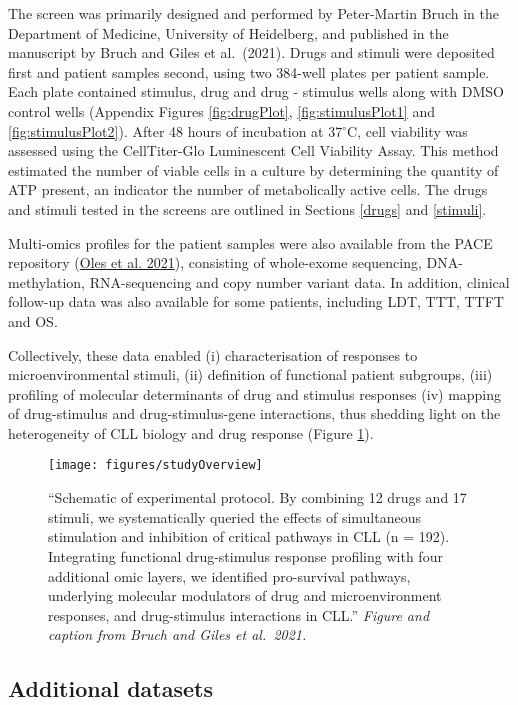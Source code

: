 \documentclass[11pt, a4paper, twosided]{book}
\begin{document}
The screen was primarily designed and performed by Peter-Martin Bruch in the Department of Medicine, University of Heidelberg, and published in the manuscript by Bruch and Giles et al.~(2021). Drugs and stimuli were deposited first and patient samples second, using two 384-well plates per patient sample. Each plate contained stimulus, drug and drug - stimulus wells along with DMSO control wells (Appendix Figures \ref{fig:drugPlot}, \ref{fig:stimulusPlot1} and \ref{fig:stimulusPlot2}). After 48 hours of incubation at 37\(^\circ\)C, cell viability was assessed using the CellTiter-Glo Luminescent Cell Viability Assay. This method estimated the number of viable cells in a culture by determining the quantity of ATP present, an indicator the number of metabolically active cells. The drugs and stimuli tested in the screens are outlined in Sections \ref{drugs} and \ref{stimuli}.

Multi-omics profiles for the patient samples were also available from the PACE repository (\protect\hyperlink{ref-R-BloodCancerMultiOmics2017}{Oles et al. 2021}), consisting of whole-exome sequencing, DNA-methylation, RNA-sequencing and copy number variant data. In addition, clinical follow-up data was also available for some patients, including LDT, TTT, TTFT and OS.

Collectively, these data enabled (i) characterisation of responses to microenvironmental stimuli, (ii) definition of functional patient subgroups, (iii) profiling of molecular determinants of drug and stimulus responses (iv) mapping of drug-stimulus and drug-stimulus-gene interactions, thus shedding light on the heterogeneity of CLL biology and drug response (Figure \ref{fig:studyOverview}).


\begin{figure}

{\centering \texttt{[image: figures/studyOverview]} 

}

\caption{``Schematic of experimental protocol. By combining 12 drugs and 17 stimuli, we systematically queried the effects of simultaneous stimulation and inhibition of critical pathways in CLL (n = 192). Integrating functional drug-stimulus response profiling with four additional omic layers, we identified pro-survival pathways, underlying molecular modulators of drug and microenvironment responses, and drug-stimulus interactions in CLL.'' \emph{Figure and caption from Bruch and Giles et al.~2021.}}\label{fig:studyOverview}
\end{figure}
\hypertarget{additional-datasets}{%
\subsection{Additional datasets}\label{additional-datasets}}
\end{document}
